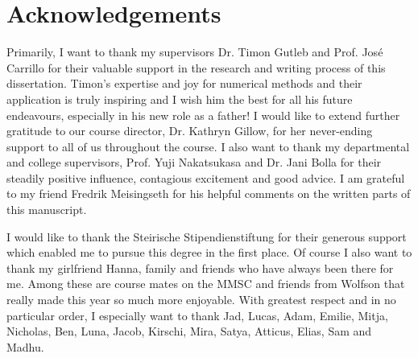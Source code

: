 \chapter*{Acknowledgements}

Primarily, I want to thank my supervisors Dr. Timon Gutleb and Prof. José Carrillo for their valuable support in the research and writing process of this dissertation.
Timon's expertise and joy for numerical methods and their application is truly inspiring and I wish him the best for all his future endeavours, especially in his new role as a father!
I would like to extend further gratitude to our course director, Dr. Kathryn Gillow, for her never-ending support to all of us throughout the course.
I also want to thank my departmental and college supervisors, Prof. Yuji Nakatsukasa and Dr. Jani Bolla for their steadily positive influence, contagious excitement and good advice.
I am grateful to my friend Fredrik Meisingseth for his helpful comments on the written parts of this manuscript.

I would like to thank the Steirische Stipendienstiftung for their generous support which enabled me to pursue this degree in the first place.
Of course I also want to thank my girlfriend Hanna, family and friends who have always been there for me.
Among these are course mates on the MMSC and friends from Wolfson that really made this year so much more enjoyable.
With greatest respect and in no particular order, I especially want to thank Jad, Lucas, Adam, Emilie, Mitja, Nicholas, Ben, Luna, Jacob, Kirschi, Mira, Satya, Atticus, Elias, Sam and Madhu.


